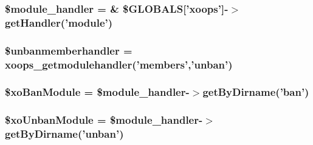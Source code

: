 \hypertarget{cron_2unbanner_8php_afe9169534dbc3935c0823c21cfbf68bb}{
\subsubsection[{\$module\-\_\-handler}]{\setlength{\rightskip}{0pt plus 5cm}\$module\-\_\-handler = \& \$G\-L\-O\-B\-A\-L\-S\mbox{[}'xoops'\mbox{]}-\/$>$get\-Handler('module')}}\label{cron_2unbanner_8php_afe9169534dbc3935c0823c21cfbf68bb}
\hypertarget{cron_2unbanner_8php_aca5d2f7b731319ff76b78409ddf053d5}{
\subsubsection[{\$unbanmemberhandler}]{\setlength{\rightskip}{0pt plus 5cm}\$unbanmemberhandler = xoops\-\_\-getmodulehandler('members','unban')}}\label{cron_2unbanner_8php_aca5d2f7b731319ff76b78409ddf053d5}
\hypertarget{cron_2unbanner_8php_a110f4b3634321d724bce871da3484f52}{
\subsubsection[{\$xo\-Ban\-Module}]{\setlength{\rightskip}{0pt plus 5cm}\$xo\-Ban\-Module = \$module\-\_\-handler-\/$>$get\-By\-Dirname('ban')}}\label{cron_2unbanner_8php_a110f4b3634321d724bce871da3484f52}
\hypertarget{cron_2unbanner_8php_ac6ad0bb9e31c6e133b077f0d7f1aecc1}{
\subsubsection[{\$xo\-Unban\-Module}]{\setlength{\rightskip}{0pt plus 5cm}\$xo\-Unban\-Module = \$module\-\_\-handler-\/$>$get\-By\-Dirname('unban')}}\label{cron_2unbanner_8php_ac6ad0bb9e31c6e133b077f0d7f1aecc1}
